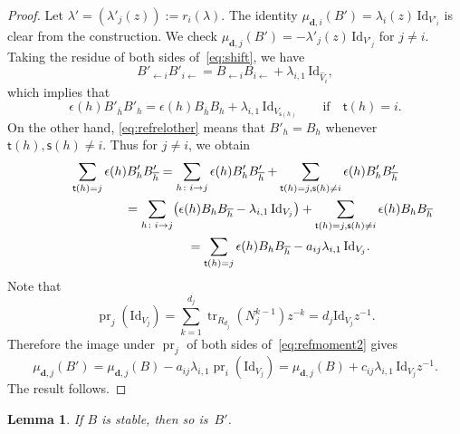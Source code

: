 \documentclass[11pt]{article}
\newcommand{\shortleftarrow}{\leftarrow}
\newcommand{\slar}{\shortleftarrow}
\numberwithin{equation}{section}
\newtheorem{Lemma}[Theorem]{Lemma}
\theoremstyle{definition}
\newcommand{\tr}{\operatorname{tr}}
\newcommand{\unit}{\mathrm{Id}}
\newcommand{\prj}{\operatorname{pr}}
\newcommand{\ov}{\overline}
\newcommand{\ved}{\mathbf{d}}
\newcommand{\vin}{\mathsf{t}} %
\newcommand{\vout}{\mathsf{s}} %
\begin{document}
\begin{proof}
Let $\lambda'=(\lambda'_j(z)) := r_i(\lambda)$.
The identity $\mu_{\ved,i}(B')=\lambda_i(z)\,\unit_{V'_i}$
is clear from the construction.
We check $\mu_{\ved,j}(B')=-\lambda'_j(z)\,\unit_{V'_j}$ for $j \neq i$.
Taking the residue of both sides of~\eqref{eq:shift}, we have
\[
 B'_{\slar i} B'_{i \slar} =  B_{\slar i} B_{i \slar}
+ \lambda_{i,1}\,\unit_{\widehat{V}_i},
\]
which implies that
\[
\epsilon(h) B'_{\ov{h}} B'_h = \epsilon(h) B_{\ov{h}} B_h
+ \lambda_{i,1}\, \unit_{V_{\vout(h)}} \qquad
\text{if} \quad \vin(h)=i.
\]
On the other hand, \eqref{eq:refrelother} means that
$B'_h = B_h$ whenever $\vin(h), \vout(h) \neq i$.
Thus for $j \neq i$, we obtain
\begin{gather}
\sum_{\vin(h)=j} \epsilon(h) B'_h B'_{\ov{h}}
 = \sum_{h \colon i \to j} \epsilon(h) B'_h B'_{\ov{h}} +
\sum_{\vin(h)=j, \vout(h) \neq i} \epsilon(h) B'_h B'_{\ov{h}} \notag\\
\hphantom{\sum_{\vin(h)=j} \epsilon(h) B'_h B'_{\ov{h}}}{}
= \sum_{h \colon i \to j}
\bigl( \epsilon(h) B_h B_{\ov{h}} - \lambda_{i,1}\,\unit_{V_j} \bigr)
+\sum_{\vin(h)=j, \vout(h) \neq i} \epsilon(h) B_h B_{\ov{h}} \notag\\
\hphantom{\sum_{\vin(h)=j} \epsilon(h) B'_h B'_{\ov{h}}}{}
=\sum_{\vin(h)=j} \epsilon(h) B_h B_{\ov{h}}
- a_{ij}\lambda_{i,1}\,\unit_{V_j}.\label{eq:refmoment2}
\end{gather}
Note that
\[
\prj_j(\unit_{V_j}) = \sum_{k=1}^{d_j} \tr_{R_{d_j}} (N_j^{k-1}) z^{-k}
= d_j \unit_{V_j} z^{-1}.
\]
Therefore the image under $\prj_j$
of both sides of~\eqref{eq:refmoment2} gives
\[
\mu_{\ved,j}(B') = \mu_{\ved,j}(B)
- a_{ij}\lambda_{i,1} \prj_i(\unit_{V_j})
=\mu_{\ved,j}(B)
+ c_{ij}\lambda_{i,1}\,\unit_{V_j}z^{-1}.
\]
The result follows.
\end{proof}

\begin{Lemma}\label{lem:refirred}
If $B$ is stable, then so is~$B'$.
\end{Lemma}
\end{document}

